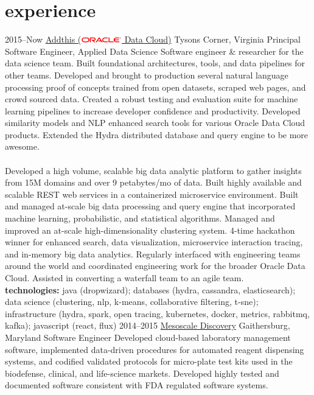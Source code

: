\documentclass[]{friggeri-cv} %
\begin{document}
\section{experience}
\begin{entrylist}
\entry
{2015--Now}
{\href{https://www.addthis.com/}{Addthis (\includegraphics[width=50pt]{500px-Oracle_logo.svg.png}  Data Cloud)}}
{Tysons Corner, Virginia}
{Principal Software Engineer, Applied Data Science}
{
	Software engineer \& researcher for the data science team. Built foundational architectures, tools, and data pipelines for other teams. Developed and brought to production several natural language processing proof of concepts trained from open datasets, scraped web pages, and crowd sourced data. Created a robust testing and evaluation suite for machine learning pipelines to increase developer confidence and productivity. Developed similarity models and NLP enhanced search tools for various Oracle Data Cloud products. Extended the Hydra distributed database and query engine to be more awesome. \\\\
	Developed a high volume, scalable big data analytic platform to gather insights from 15M domains and over 9 petabytes/mo of data. Built highly available and scalable REST web services in a containerized microservice environment. Built and managed at-scale big data processing and query engine that incorporated machine learning, probabilistic, and statistical algorithms. Managed and improved an at-scale high-dimensionality clustering system. 4-time hackathon winner for enhanced search, data visualization, microservice interaction tracing, and in-memory big data analytics. Regularly interfaced with engineering teams around the world and coordinated engineering work for the broader Oracle Data Cloud. Assisted in converting a waterfall team to an agile team.\\
	\textbf{technologies:} java (dropwizard); databases (hydra, cassandra, elasticsearch); data science (clustering, nlp, k-means, collaborative filtering, t-sne); infrastructure (hydra, spark, open tracing, kubernetes, docker, metrics, rabbitmq, kafka); javascript (react, flux)
}
\entry
{2014--2015}
{\href{https://www.mesoscale.com/}{Mesoscale Discovery}}
{Gaithersburg, Maryland}
{Software Engineer}
{
	Developed cloud-based laboratory management software, implemented data-driven procedures for automated reagent dispensing systems, and codified validated protocols for micro-plate test kits used in the biodefense, clinical, and life-science markets. Developed highly tested and documented software consistent with FDA regulated software systems.\\
}
\end{entrylist}
\end{document}
